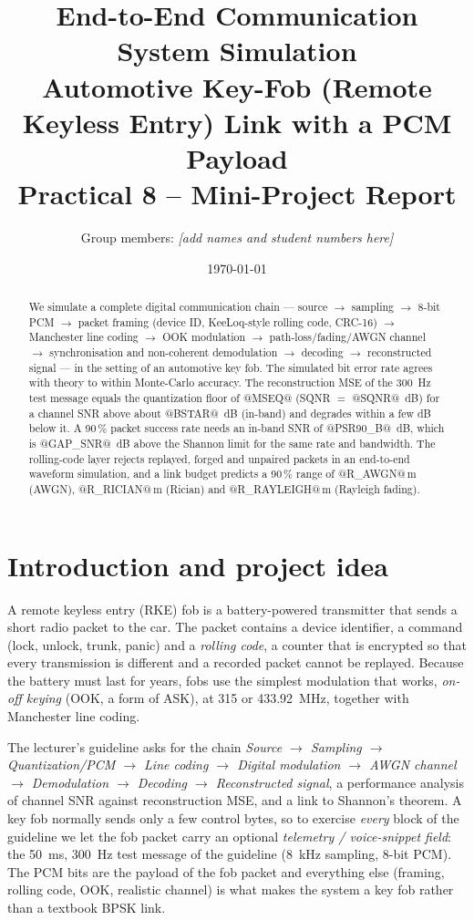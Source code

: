 \documentclass[11pt,a4paper]{article}
\title{\textbf{End-to-End Communication System Simulation}\\[2pt]
\large Automotive Key-Fob (Remote Keyless Entry) Link with a PCM Payload\\[2pt]
\normalsize Practical 8 -- Mini-Project Report}
\author{Group members: \textit{[add names and student numbers here]}}
\date{\today}
\begin{document}
\maketitle
\begin{abstract}
We simulate a complete digital communication chain --- source $\to$ sampling $\to$ 8-bit PCM $\to$ packet framing
(device ID, KeeLoq-style rolling code, CRC-16) $\to$ Manchester line coding $\to$ OOK modulation $\to$ path-loss/fading/AWGN channel
$\to$ synchronisation and non-coherent demodulation $\to$ decoding $\to$ reconstructed signal --- in the setting of an automotive key fob.
The simulated bit error rate agrees with theory to within Monte-Carlo accuracy. The reconstruction MSE of the 300~Hz test message equals the quantization floor
of @MSEQ@ (SQNR $=$ @SQNR@~dB) for a channel SNR above about @BSTAR@~dB (in-band) and degrades within a few dB below it.
A 90\,\% packet success rate needs an in-band SNR of @PSR90_B@~dB, which is @GAP_SNR@~dB above the Shannon limit for the same rate and bandwidth.
The rolling-code layer rejects replayed, forged and unpaired packets in an end-to-end waveform simulation, and a link budget predicts a 90\,\% range of
@R_AWGN@\,m (AWGN), @R_RICIAN@\,m (Rician) and @R_RAYLEIGH@\,m (Rayleigh fading).
\end{abstract}

\tableofcontents
\newpage

\section{Introduction and project idea}
A remote keyless entry (RKE) fob is a battery-powered transmitter that sends a short radio packet to the car. The packet contains a device
identifier, a command (lock, unlock, trunk, panic) and a \emph{rolling code}, a counter that is encrypted so that every transmission is different and a
recorded packet cannot be replayed. Because the battery must last for years, fobs use the simplest modulation that works, \emph{on-off keying} (OOK, a form of ASK),
at 315 or 433.92~MHz, together with Manchester line coding.

The lecturer's guideline asks for the chain \emph{Source $\to$ Sampling $\to$ Quantization/PCM $\to$ Line coding $\to$ Digital modulation $\to$ AWGN channel
$\to$ Demodulation $\to$ Decoding $\to$ Reconstructed signal}, a performance analysis of channel SNR against reconstruction MSE, and a link to Shannon's theorem.
A key fob normally sends only a few control bytes, so to exercise \emph{every} block of the guideline we let the fob packet carry an optional
\emph{telemetry / voice-snippet field}: the 50~ms, 300~Hz test message of the guideline (8~kHz sampling, 8-bit PCM). The PCM bits are the payload of the fob packet and
everything else (framing, rolling code, OOK, realistic channel) is what makes the system a key fob rather than a textbook BPSK link.
\end{document}
